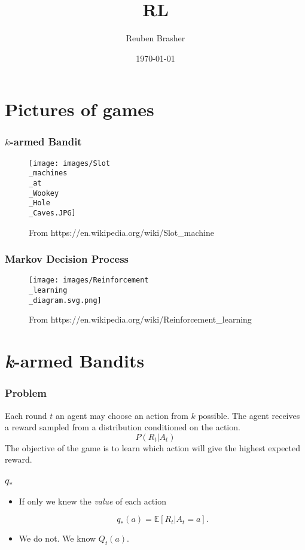 \documentclass{beamer}
\title{RL}
\author{Reuben Brasher}
\date{\today}
\begin{document}
\frame{\titlepage}

\section[Outline]{}
\frame{\tableofcontents}

\section{Pictures of games}

\frame
{
   \frametitle{$k$-armed Bandit}
   
   
   \begin{figure}[ht]
      \texttt{[image: images/Slot\\\_machines\\\_at\\\_Wookey\\\_Hole\\\_Caves.JPG]}
      \caption{From https://en.wikipedia.org/wiki/Slot\_machine} \label{fig:narmed}
   \end{figure}
}

\frame
{
   \frametitle{Markov Decision Process}
   
   
   \begin{figure}[ht]
      \texttt{[image: images/Reinforcement\\\_learning\\\_diagram.svg.png]}
      \caption{From https://en.wikipedia.org/wiki/Reinforcement\_learning} \label{fig:mdp}
   \end{figure}
}

\section{\textit{k}-armed Bandits}

\frame
{
   \frametitle{Problem}

   Each round $t$ an agent may choose an action from $k$ possible. The agent
   receives a reward sampled from a distribution conditioned on the action.
   $$P(R_t|A_t)$$
   The objective of the game is to learn which action will give the highest
   expected reward.
}

\frame
{
   \frametitle{$q_*$}

   \begin{itemize}
      \item<1-> If only we knew the \textit{value} of each action

      $$q_*(a) = \mathbb{E} [R_t | A_t=a].$$

      \item<2-> We do not. We know $Q_t(a)$.

   \end{itemize}
}
\end{document}
